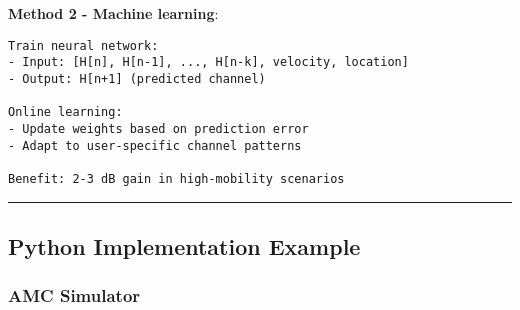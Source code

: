 \textbf{Method 2 - Machine learning}:

\begin{verbatim}
Train neural network:
- Input: [H[n], H[n-1], ..., H[n-k], velocity, location]
- Output: H[n+1] (predicted channel)

Online learning:
- Update weights based on prediction error
- Adapt to user-specific channel patterns

Benefit: 2-3 dB gain in high-mobility scenarios
\end{verbatim}

\begin{center}\rule{0.5\linewidth}{0.5pt}\end{center}

\subsection{Python Implementation Example}\label{python-implementation-example}

\subsubsection{AMC Simulator}\label{amc-simulator}

